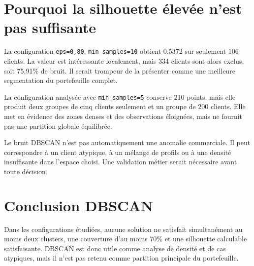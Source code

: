
\section{Pourquoi la silhouette élevée n'est pas suffisante}
La configuration \texttt{eps=0,80}, \texttt{min\_samples=10} obtient 0,5372 sur seulement 106 clients. La valeur est intéressante localement, mais 334 clients sont alors exclus, soit 75,91\% de bruit. Il serait trompeur de la présenter comme une meilleure segmentation du portefeuille complet.

La configuration analysée avec \texttt{min\_samples=5} conserve 210 points, mais elle produit deux groupes de cinq clients seulement et un groupe de 200 clients. Elle met en évidence des zones denses et des observations éloignées, mais ne fournit pas une partition globale équilibrée.

\begin{precaution}
Le bruit DBSCAN n'est pas automatiquement une anomalie commerciale. Il peut correspondre à un client atypique, à un mélange de profils ou à une densité insuffisante dans l'espace choisi. Une validation métier serait nécessaire avant toute décision.
\end{precaution}

\section{Conclusion DBSCAN}
Dans les configurations étudiées, aucune solution ne satisfait simultanément au moins deux clusters, une couverture d'au moins 70\% et une silhouette calculable satisfaisante. DBSCAN est donc utile comme analyse de densité et de cas atypiques, mais il n'est pas retenu comme partition principale du portefeuille.
